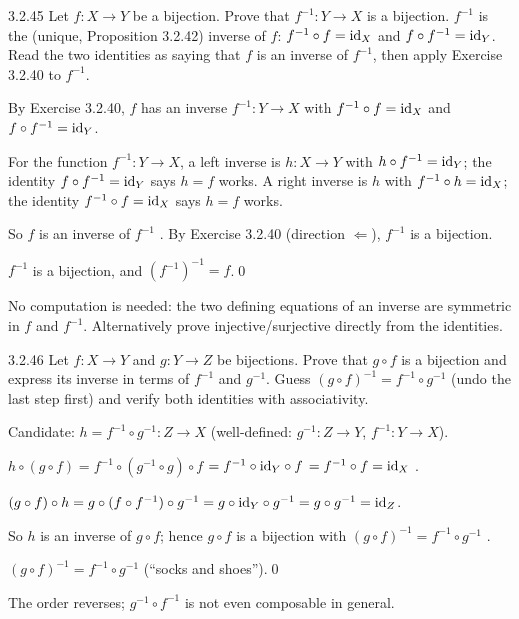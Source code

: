 \begin{bookex}[recommended]{3.2.45}
Let $f:X\to Y$ be a bijection. Prove that $f^{-1}:Y\to X$ is a bijection.
\solution
\given $f^{-1}$ is the (unique, Proposition 3.2.42) inverse of $f$: $f^{-1}\circ f=\mathrm{id}_X$ and $f\circ f^{-1}=\mathrm{id}_Y$.
\plan Read the two identities as saying that $f$ is an inverse of $f^{-1}$, then apply Exercise 3.2.40 to $f^{-1}$.
\begin{steps}
\item By Exercise 3.2.40, $f$ has an inverse $f^{-1}:Y\to X$ with $f^{-1}\circ f=\mathrm{id}_X$ and $f\circ f^{-1}=\mathrm{id}_Y$.
\item For the function $f^{-1}:Y\to X$, a left inverse is $h:X\to Y$ with $h\circ f^{-1}=\mathrm{id}_Y$; the identity $f\circ f^{-1}=\mathrm{id}_Y$ says $h=f$ works. A right inverse is $h$ with $f^{-1}\circ h=\mathrm{id}_X$; the identity $f^{-1}\circ f=\mathrm{id}_X$ says $h=f$ works.
\item So $f$ is an inverse of $f^{-1}$ . By Exercise 3.2.40 (direction $\Leftarrow$), $f^{-1}$ is a bijection.
\end{steps}
\conclusion $f^{-1}$ is a bijection, and $(f^{-1})^{-1}=f$.\qed
\begin{compare}
\item No computation is needed: the two defining equations of an inverse are symmetric in $f$ and $f^{-1}$. Alternatively prove injective/surjective directly from the identities.
\end{compare}
\end{bookex}

\begin{bookex}[recommended]{3.2.46}
Let $f:X\to Y$ and $g:Y\to Z$ be bijections. Prove that $g\circ f$ is a bijection and express its inverse in terms of $f^{-1}$ and $g^{-1}$.
\solution
\plan Guess $(g\circ f)^{-1}=f^{-1}\circ g^{-1}$ (undo the last step first) and verify both identities with associativity.
\begin{steps}
\item Candidate: $h=f^{-1}\circ g^{-1}:Z\to X$ (well-defined: $g^{-1}:Z\to Y$, $f^{-1}:Y\to X$).
\item $h\circ(g\circ f)=f^{-1}\circ(g^{-1}\circ g)\circ f$  $=f^{-1}\circ\mathrm{id}_Y\circ f$  $=f^{-1}\circ f=\mathrm{id}_X$ .
\item $(g\circ f)\circ h=g\circ(f\circ f^{-1})\circ g^{-1}=g\circ\mathrm{id}_Y\circ g^{-1}=g\circ g^{-1}=\mathrm{id}_Z$.
\item So $h$ is an inverse of $g\circ f$; hence $g\circ f$ is a bijection  with $(g\circ f)^{-1}=f^{-1}\circ g^{-1}$ .
\end{steps}
\conclusion $(g\circ f)^{-1}=f^{-1}\circ g^{-1}$ (``socks and shoes'').\qed
\begin{compare}
\item The order reverses; $g^{-1}\circ f^{-1}$ is not even composable in general.
\end{compare}
\end{bookex}

